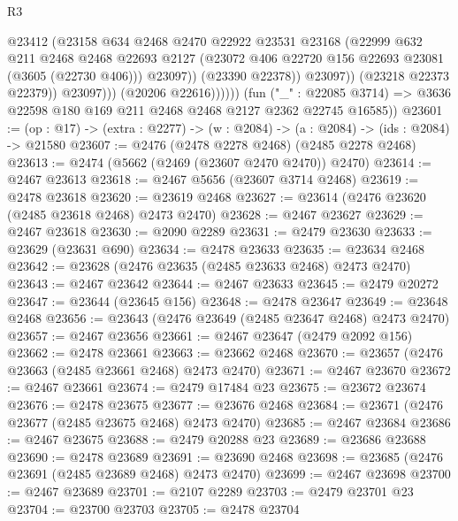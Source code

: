 \begin{lexlean}{R3}
\begin{coremodule}
                              @23412
                              (@23158
                                @634
                                @2468
                                @2470
                                @22922
                                @23531
                                @23168
                                (@22999
                                  @632
                                  @211
                                  @2468
                                  @2468
                                  @22693
                                  @2127
                                  (@23072 @406 @22720 @156 @22693 @23081 (@3605 (@22730 @406)))
                                  @23097))
                              (@23390 @22378))
                            @23097))
                        (@23218 @22373 @22379))
                      @23097)))
                (@20206 @22616))))))
      (fun ("_" : @22085 @3714) =>
      @3636 @22598 @180 @169 @211 @2468 @2468 @2127 @2362 @22745 @16585))
@23601 := (op : @17) -> (extra : @2277) -> (w : @2084) -> (a : @2084) -> (ids : @2084) -> @21580
@23607 := @2476 (@2478 @2278 @2468) (@2485 @2278 @2468)
@23613 := @2474 (@5662 (@2469 (@23607 @2470 @2470)) @2470)
@23614 := @2467 @23613
@23618 := @2467 @5656 (@23607 @3714 @2468)
@23619 := @2478 @23618
@23620 := @23619 @2468
@23627 := @23614 (@2476 @23620 (@2485 @23618 @2468) @2473 @2470)
@23628 := @2467 @23627
@23629 := @2467 @23618
@23630 := @2090 @2289
@23631 := @2479 @23630
@23633 := @23629 (@23631 @690)
@23634 := @2478 @23633
@23635 := @23634 @2468
@23642 := @23628 (@2476 @23635 (@2485 @23633 @2468) @2473 @2470)
@23643 := @2467 @23642
@23644 := @2467 @23633
@23645 := @2479 @20272
@23647 := @23644 (@23645 @156)
@23648 := @2478 @23647
@23649 := @23648 @2468
@23656 := @23643 (@2476 @23649 (@2485 @23647 @2468) @2473 @2470)
@23657 := @2467 @23656
@23661 := @2467 @23647 (@2479 @2092 @156)
@23662 := @2478 @23661
@23663 := @23662 @2468
@23670 := @23657 (@2476 @23663 (@2485 @23661 @2468) @2473 @2470)
@23671 := @2467 @23670
@23672 := @2467 @23661
@23674 := @2479 @17484 @23
@23675 := @23672 @23674
@23676 := @2478 @23675
@23677 := @23676 @2468
@23684 := @23671 (@2476 @23677 (@2485 @23675 @2468) @2473 @2470)
@23685 := @2467 @23684
@23686 := @2467 @23675
@23688 := @2479 @20288 @23
@23689 := @23686 @23688
@23690 := @2478 @23689
@23691 := @23690 @2468
@23698 := @23685 (@2476 @23691 (@2485 @23689 @2468) @2473 @2470)
@23699 := @2467 @23698
@23700 := @2467 @23689
@23701 := @2107 @2289
@23703 := @2479 @23701 @23
@23704 := @23700 @23703
@23705 := @2478 @23704

\end{coremodule}
\end{lexlean}
